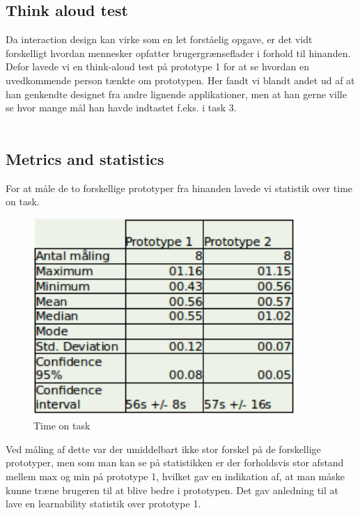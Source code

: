 \subsection*{Think aloud test}
Da interaction design kan virke som en let forståelig opgave, er det vidt forskelligt hvordan mennesker opfatter brugergrænseflader i forhold til hinanden. Defor lavede vi en think-aloud test på prototype 1 for at se hvordan en uvedkommende person tænkte om prototypen. Her fandt vi blandt andet ud af at han genkendte designet fra andre lignende applikationer, men at han gerne ville se hvor mange mål han havde indtastet f.eks. i task 3.\\\\ 

\subsection*{Metrics and statistics}
For at måle de to forskellige prototyper fra hinanden lavede vi statistik over time on task. 
\begin{figure}[ht!]
\centering
\includegraphics[width=100mm]{images/timeontask}
\caption{Time on task}
\end{figure}
Ved måling af dette var der umiddelbart ikke stor forskel på de forskellige prototyper, men som man kan se på statistikken er der forholdsvis stor afstand mellem max og min på prototype 1, hvilket gav en indikation af, at man måske kunne træne brugeren til at blive bedre i prototypen. Det gav anledning til at lave en learnability statistik over prototype 1.\\\\

